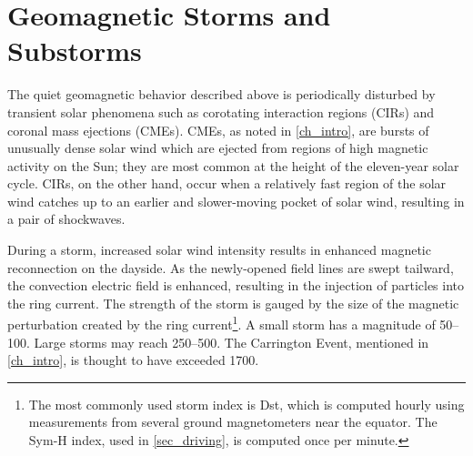 

\section{Geomagnetic Storms and Substorms}
  \label{sec_storms}

The quiet geomagnetic behavior described above is periodically disturbed by transient solar phenomena such as corotating interaction regions (CIRs) and coronal mass ejections (CMEs). CMEs, as noted in \cref{ch_intro}, are bursts of unusually dense solar wind which are ejected from regions of high magnetic activity on the Sun; they are most common at the height of the eleven-year solar cycle. CIRs, on the other hand, occur when a relatively fast region of the solar wind catches up to an earlier and slower-moving pocket of solar wind, resulting in a pair of shockwaves. 

During a storm, increased solar wind intensity results in enhanced magnetic reconnection on the dayside. As the newly-opened field lines are swept tailward, the convection electric field is enhanced, resulting in the injection of particles into the ring current\cite{mcpherron_1997}. The strength of the storm is gauged by the size of the magnetic perturbation created by the ring current\footnote{The most commonly used storm index is Dst, which is computed hourly using measurements from several ground magnetometers near the equator. The Sym-H index, used in \cref{sec_driving}, is computed once per minute. }. A small storm has a magnitude of \SIrange{50}{100}{\nT}. Large storms may reach \SIrange{250}{500}{\nT}. The Carrington Event, mentioned in \cref{ch_intro}, is thought to have exceeded \SI{1700}{\nT}\cite{tsurutani_2003}. 








